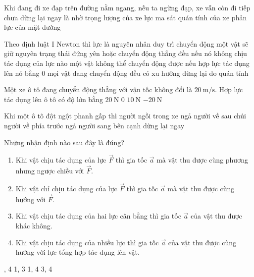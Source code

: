 \begin{ex}
	Khi đang đi xe đạp trên đường nằm ngang, nếu ta ngừng đạp, xe vẫn còn đi tiếp chưa dừng lại ngay là nhờ
	\choice
	{trọng lượng của xe}
	{lực ma sát}
	{\True quán tính của xe}
	{phản lực của mặt đường}
	\loigiai{}
\end{ex}
\begin{ex}
Theo định luật I Newton thì 	
	\choice
	{lực là nguyên nhân duy trì chuyển động}
	{\True một vật sẽ giữ nguyên trạng thái đứng yên hoặc chuyển động thẳng đều nếu nó không chịu tác dụng của lực nào}
	{một vật không thể chuyển động được nếu hợp lực tác dụng lên nó bằng 0}
	{mọi vật đang chuyển động đều có xu hướng dừng lại do quán tính}
	\loigiai{}
\end{ex}
\begin{ex}
	Một xe ô tô đang chuyển động thẳng với vận tốc không đổi là $\SI{20}{\meter/\second}$. Hợp lực tác dụng lên ô tô có độ lớn bằng
	\choice
	{$\SI{20}{\newton}$}
	{\True $0$}
	{$\SI{10}{\newton}$}
	{$\SI{-20}{\newton}$}
	\loigiai{}
\end{ex}
\begin{ex}
Khi một ô tô đột ngột phanh gấp thì người ngồi trong xe	
	\choice
	{ngả người về sau}
	{\True chúi người về phía trước}
	{ngả người sang bên cạnh}
	{dừng lại ngay}
	\loigiai{}
\end{ex}
\begin{ex}
	Những nhận định nào sau đây là đúng?
	\begin{enumerate}[label=\arabic*.]
		\item Khi vật chịu tác dụng của lực $\vec{F}$ thì gia tốc $\vec{a}$ mà vật thu được cùng phương nhưng ngược chiều với $\vec{F}$.
		\item Khi vật chỉ chịu tác dụng của lực $\vec{F}$ thì gia tốc $\vec{a}$ mà vật thu được cùng hướng với $\vec{F}$.
		\item Khi vật chịu tác dụng của hai lực cân bằng thì gia tốc $\vec{a}$ của vật thu được khác không.
		\item Khi vật chịu tác dụng của nhiều lực thì gia tốc $\vec{a}$ của vật thu được cùng hướng với lực tổng hợp tác dụng lên vật.
	\end{enumerate}
	\choice
	{, 4}
	{1, 3}
	{1, 4}
	{3, 4}
	\loigiai{}
\end{ex}
